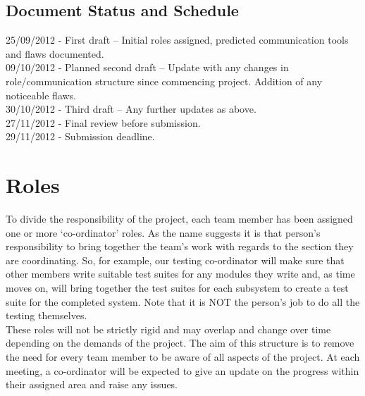 \documentclass{l3deliverable}
\begin{document}
\subsection{Document Status and Schedule}

25/09/2012 - First draft – Initial roles assigned, predicted communication tools and flaws documented.\\
{\color{red}09/10/2012} - Planned second draft – Update with any changes in role/communication structure since commencing project. Addition of any noticeable flaws.\\
{\color{red}30/10/2012} - Third draft – Any further updates as above.\\
{\color{red}27/11/2012} - Final review before submission.\\
{\color{red}29/11/2012} - Submission deadline.\\


\section{Roles}

To divide the responsibility of the project, each team member has been assigned one or more `co-ordinator' roles. As the name suggests it is that person's responsibility to bring together the team's work with regards to the section they are coordinating. So, for example, our testing co-ordinator will make sure that other members write suitable test suites for any modules they write and, as time moves on, will bring together the test suites for each subsystem to create a test suite for the completed system. Note that it is NOT the person's job to do all the testing themselves. 
\\
These roles will not be strictly rigid and may overlap and change over time depending on the demands of the project. The aim of this structure is to remove the need for every team member to be aware of all aspects of the project. At each meeting, a co-ordinator will be expected to give an update on the progress within their assigned area and raise any issues.
\\

\begin{comment}
	i've changed 
		Dan's role from File/Communication Management to Configuration Manager
		My role from Test Manager to Toolsmith
		Michael's role from Design and API Management/Secretary to Project Manager
		
\end{comment}
\end{document}
